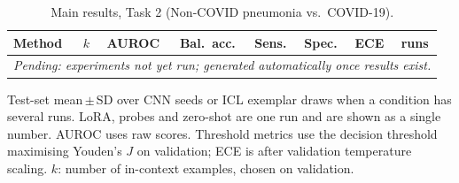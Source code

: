 \begin{table}[t]
\centering
\scriptsize
\caption{Main results, Task 2 (Non-COVID pneumonia vs.\ COVID-19).}
\label{tab:main_task2}
\begin{tabular}{lccccccc}
\toprule
Method & $k$ & AUROC & Bal.\ acc. & Sens. & Spec. & ECE & runs\\
\midrule
\multicolumn{8}{l}{\textit{Pending: experiments not yet run; generated automatically once results exist.}}\\
\bottomrule
\end{tabular}
\par\vspace{2pt}\footnotesize Test-set mean\,$\pm$\,SD over CNN seeds or ICL exemplar draws when a condition has several runs. LoRA, probes and zero-shot are one run and are shown as a single number. AUROC uses raw scores. Threshold metrics use the decision threshold maximising Youden's $J$ on validation; ECE is after validation temperature scaling. $k$: number of in-context examples, chosen on validation.
\end{table}
